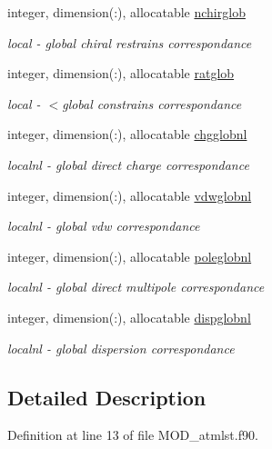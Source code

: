 \begin{DoxyCompactItemize}
integer, dimension(\-:), allocatable \hyperlink{classatmlst_a8fea084e4438f63e3205464b04ffd146}{nchirglob}
\begin{DoxyCompactList}\small\item\em local -\/ global chiral restrains correspondance \end{DoxyCompactList}\item 
integer, dimension(\-:), allocatable \hyperlink{classatmlst_a3ee68ae20a26265fc2ce8eed93f5cbec}{ratglob}
\begin{DoxyCompactList}\small\item\em local -\/ $<$global constrains correspondance \end{DoxyCompactList}\item 
integer, dimension(\-:), allocatable \hyperlink{classatmlst_a82002ff33f394239f8587334aa1533b3}{chgglobnl}
\begin{DoxyCompactList}\small\item\em localnl -\/ global direct charge correspondance \end{DoxyCompactList}\item 
integer, dimension(\-:), allocatable \hyperlink{classatmlst_ab9b4d4c497ef4f8f710514366b06cd8f}{vdwglobnl}
\begin{DoxyCompactList}\small\item\em localnl -\/ global vdw correspondance \end{DoxyCompactList}\item 
integer, dimension(\-:), allocatable \hyperlink{classatmlst_a1d0ed805ac493ce6f1157f6c2c2dc4ea}{poleglobnl}
\begin{DoxyCompactList}\small\item\em localnl -\/ global direct multipole correspondance \end{DoxyCompactList}\item 
integer, dimension(\-:), allocatable \hyperlink{classatmlst_a8f2f229104f82c885138a2f8afe9c761}{dispglobnl}
\begin{DoxyCompactList}\small\item\em localnl -\/ global dispersion correspondance \end{DoxyCompactList}\end{DoxyCompactItemize}


\subsection{Detailed Description}


Definition at line 13 of file M\-O\-D\-\_\-atmlst.\-f90.



